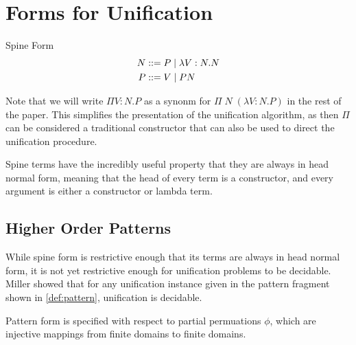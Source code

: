 \section{Forms for Unification}

\begin{definition}
Spine Form
\begin{align}
N &::= P
   \; | \; \lambda V : N . N 
\\
P &::= V 
  \; | \; P N 
\end{align}
\label{def:spine}
\end{definition}

Note that we will write $\Pi V : N . P$ as a synonm for 
$\Pi\; N \; (\lambda V : N . P)$ in the rest of the paper.
This simplifies the presentation of the unification algorithm, 
as then $\Pi$ can be considered a traditional constructor
that can also be used to direct the unification procedure.

Spine terms have the incredibly useful property that they are always in head normal form, 
meaning that the head of every term is a constructor, 
and every argument is either a constructor or lambda term.

\subsection{Higher Order Patterns}

While spine form is restrictive enough that its terms are always in head normal form, 
it is not yet restrictive enough for unification problems to be decidable.  
Miller \citep{miller1991logic} showed that for any unification instance given in 
the pattern fragment shown in \ref{def:pattern}, unification is decidable.  

Pattern form is specified with respect to partial permuations $\phi$, 
which are injective mappings from finite domains to finite domains.

